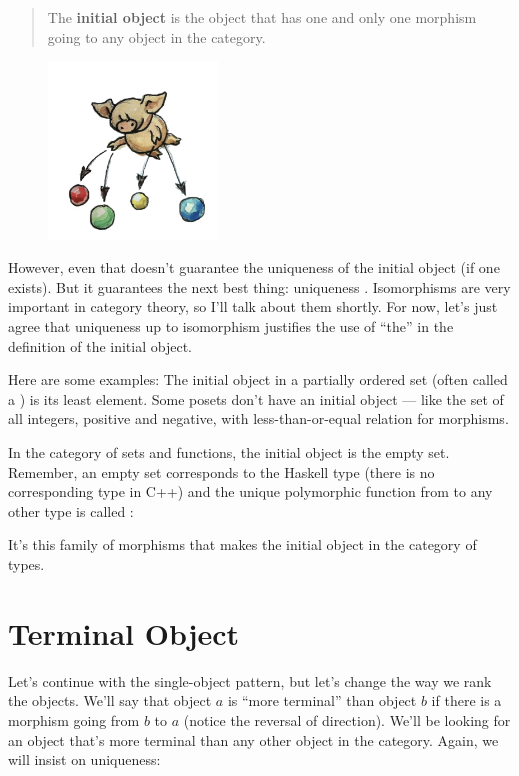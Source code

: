 \begin{quote}
  The \textbf{initial object} is the object that has one and only one
  morphism going to any object in the category.
\end{quote}

\begin{figure}[H]
  \centering
  \includegraphics[width=0.4\textwidth]{images/initial.jpg}
\end{figure}

\noindent
However, even that doesn't guarantee the uniqueness of the initial
object (if one exists). But it guarantees the next best thing:
uniqueness . Isomorphisms are very important in
category theory, so I'll talk about them shortly. For now, let's just
agree that uniqueness up to isomorphism justifies the use of ``the'' in
the definition of the initial object.

Here are some examples: The initial object in a partially ordered set
(often called a ) is its least element. Some posets don't
have an initial object --- like the set of all integers, positive and
negative, with less-than-or-equal relation for morphisms.

In the category of sets and functions, the initial object is the empty
set. Remember, an empty set corresponds to the Haskell type
 (there is no corresponding type in C++) and the unique
polymorphic function from  to any other type is called
:

It's this family of morphisms that makes  the initial
object in the category of types.

\section{Terminal Object}

Let's continue with the single-object pattern, but let's change the way
we rank the objects. We'll say that object $a$ is ``more terminal''
than object $b$ if there is a morphism going from $b$ to
$a$ (notice the reversal of direction). We'll be looking for an
object that's more terminal than any other object in the category.
Again, we will insist on uniqueness:

